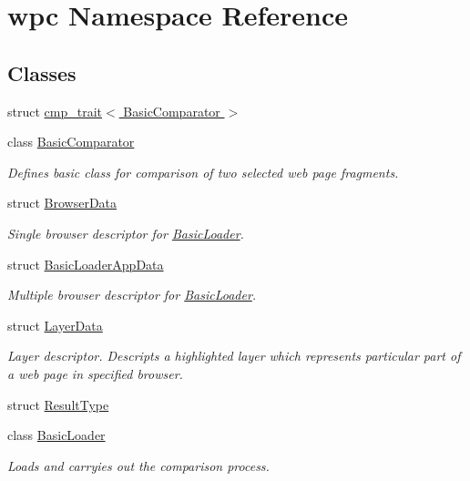 \hypertarget{namespacewpc}{\section{wpc Namespace Reference}
\label{namespacewpc}
}
\subsection*{Classes}
\begin{DoxyCompactItemize}
\item 
struct \hyperlink{structwpc_1_1cmp__trait_3_01_basic_comparator_01_4}{cmp\-\_\-trait$<$ Basic\-Comparator $>$}
\item 
class \hyperlink{classwpc_1_1_basic_comparator}{Basic\-Comparator}
\begin{DoxyCompactList}\small\item\em Defines basic class for comparison of two selected web page fragments. \end{DoxyCompactList}\item 
struct \hyperlink{structwpc_1_1_browser_data}{Browser\-Data}
\begin{DoxyCompactList}\small\item\em Single browser descriptor for \hyperlink{classwpc_1_1_basic_loader}{Basic\-Loader}. \end{DoxyCompactList}\item 
struct \hyperlink{structwpc_1_1_basic_loader_app_data}{Basic\-Loader\-App\-Data}
\begin{DoxyCompactList}\small\item\em Multiple browser descriptor for \hyperlink{classwpc_1_1_basic_loader}{Basic\-Loader}. \end{DoxyCompactList}\item 
struct \hyperlink{structwpc_1_1_layer_data}{Layer\-Data}
\begin{DoxyCompactList}\small\item\em Layer descriptor. Descripts a highlighted layer which represents particular part of a web page in specified browser. \end{DoxyCompactList}\item 
struct \hyperlink{structwpc_1_1_result_type}{Result\-Type}
\item 
class \hyperlink{classwpc_1_1_basic_loader}{Basic\-Loader}
\begin{DoxyCompactList}\small\item\em Loads and carryies out the comparison process. \end{DoxyCompactList}\item 

\end{DoxyCompactItemize}
